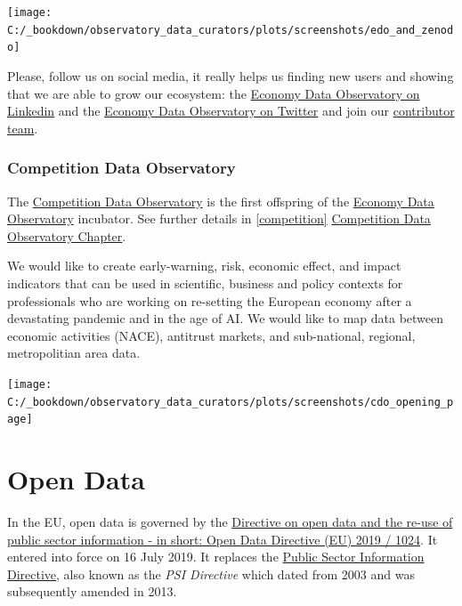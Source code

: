 \documentclass[
  a4paper,
  openany, a4paper, oneside]{book}
\begin{document}
\begin{center}\texttt{[image: C:/\_bookdown/observatory\_data\_curators/plots/screenshots/edo\_and\_zenodo]} \end{center}

Please, follow us on social media, it really helps us finding new users and showing that we are able to grow our ecosystem: the \href{https://www.linkedin.com/company/78562153/}{Economy Data Observatory on Linkedin} and the \href{https://twitter.com/EconDataObs/}{Economy Data Observatory on Twitter} and join our \href{https://economy.dataobservatory.eu/\#contributors}{contributor team}.

\hypertarget{competition-data-observatory}{%
\subsection*{Competition Data Observatory}\label{competition-data-observatory}}

The \href{https://competition-data-observatory.netlify.app/}{Competition Data Observatory} is the first offspring of the \href{https://economy.dataobservatory.eu/}{Economy Data Observatory} incubator. See further details in \ref{competition} \protect\hyperlink{competition}{Competition Data Observatory Chapter}.

We would like to create early-warning, risk, economic effect, and impact indicators that can be used in scientific, business and policy contexts for professionals who are working on re-setting the European economy after a devastating pandemic and in the age of AI. We would like to map data between economic activities (NACE), antitrust markets, and sub-national, regional, metropolitian area data.

\begin{center}\texttt{[image: C:/\_bookdown/observatory\_data\_curators/plots/screenshots/cdo\_opening\_page]} \end{center}

\hypertarget{open-data}{%
\chapter{Open Data}\label{open-data}}

In the EU, open data is governed by the \href{https://eur-lex.europa.eu/legal-content/EN/TXT/?qid=1561563110433\&uri=CELEX:32019L1024}{Directive on open data and the re-use of public sector information - in short: Open Data Directive (EU) 2019 / 1024}. It entered into force on 16 July 2019. It replaces the \href{https://eur-lex.europa.eu/legal-content/en/ALL/?uri=CELEX:32003L0098}{Public Sector Information Directive}, also known as the \emph{PSI Directive} which dated from 2003 and was subsequently amended in 2013.
\end{document}
